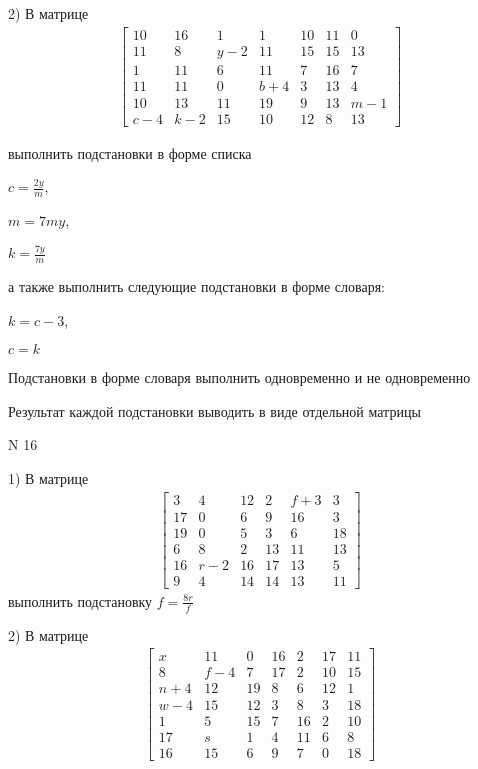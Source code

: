 \documentclass[11pt]{report}
\begin{document}
    2) В матрице
\begin{align*}
\left[\begin{matrix}10 & 16 & 1 & 1 & 10 & 11 & 0\\11 & 8 & y - 2 & 11 & 15 & 15 & 13\\1 & 11 & 6 & 11 & 7 & 16 & 7\\11 & 11 & 0 & b + 4 & 3 & 13 & 4\\10 & 13 & 11 & 19 & 9 & 13 & m - 1\\c - 4 & k - 2 & 15 & 10 & 12 & 8 & 13\end{matrix}\right]
\end{align*}

выполнить подстановки в форме списка

$c=\frac{2 y}{m}$,

$m=7 m y$,

$k=\frac{7 y}{m}$

а также выполнить следующие подстановки в форме словаря:

$k=c - 3$,

$c=k$


    Подстановки в форме словаря выполнить одновременно и не одновременно


    Результат каждой подстановки выводить в виде отдельной матрицы

\newpage
N 16


    1) В матрице
\begin{align*}
\left[\begin{matrix}3 & 4 & 12 & 2 & f + 3 & 3\\17 & 0 & 6 & 9 & 16 & 3\\19 & 0 & 5 & 3 & 6 & 18\\6 & 8 & 2 & 13 & 11 & 13\\16 & r - 2 & 16 & 17 & 13 & 5\\9 & 4 & 14 & 14 & 13 & 11\end{matrix}\right]
\end{align*}
выполнить подстановку $f=\frac{8 r}{f}$


    2) В матрице
\begin{align*}
\left[\begin{matrix}x & 11 & 0 & 16 & 2 & 17 & 11\\8 & f - 4 & 7 & 17 & 2 & 10 & 15\\n + 4 & 12 & 19 & 8 & 6 & 12 & 1\\w - 4 & 15 & 12 & 3 & 8 & 3 & 18\\1 & 5 & 15 & 7 & 16 & 2 & 10\\17 & s & 1 & 4 & 11 & 6 & 8\\16 & 15 & 6 & 9 & 7 & 0 & 18\end{matrix}\right]
\end{align*}
\end{document}
